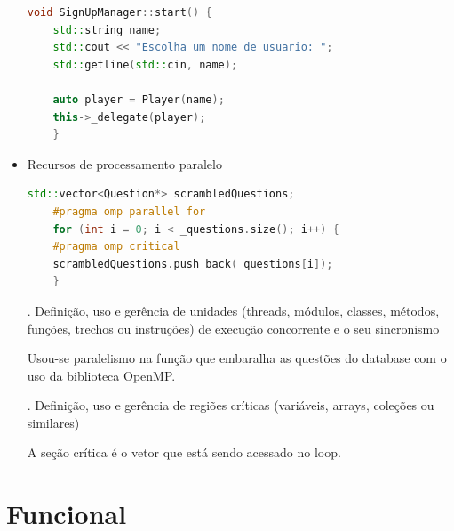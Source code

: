 \documentclass[rel_mlp]{iiufrgs}
\begin{document}
\begin{itemize}
\begin{lstlisting}[language=C++, caption={Uso de delegate}]
	void SignUpManager::start() {
	std::string name;
	std::cout << "Escolha um nome de usuario: ";
	std::getline(std::cin, name);
	
	auto player = Player(name);
	this->_delegate(player);
	}
	\end{lstlisting}
	
	
	\item Recursos de processamento paralelo
	
	\begin{lstlisting}[language=C++, caption={Uso de Paralelismo}]
	std::vector<Question*> scrambledQuestions;
	#pragma omp parallel for
	for (int i = 0; i < _questions.size(); i++) {
	#pragma omp critical
	scrambledQuestions.push_back(_questions[i]);
	}
	\end{lstlisting}
	
	. Definição, uso e gerência de unidades (threads, módulos, classes, métodos, funções, trechos ou instruções) de execução concorrente e o seu sincronismo
	
	Usou-se paralelismo na função que embaralha as questões do database com o uso da biblioteca OpenMP.
	
	. Definição, uso e gerência de regiões críticas (variáveis, arrays, coleções ou similares)

	A seção crítica é o vetor que está sendo acessado no loop.
\end{itemize}

\section{Funcional}
\end{document}
